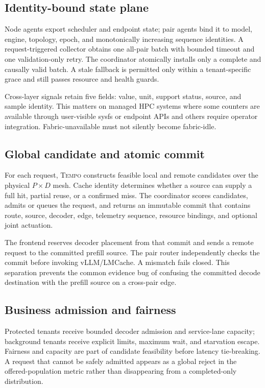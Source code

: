 \documentclass[10pt,twocolumn]{article}
\newcommand{\system}{\textsc{Tempo}\xspace}
\begin{document}
\subsection{Identity-bound state plane}

Node agents export scheduler and endpoint state; pair agents bind it to model,
engine, topology, epoch, and monotonically increasing sequence identities.  A
request-triggered collector obtains one all-pair batch with bounded timeout and
one validation-only retry.  The coordinator atomically installs only a complete
and causally valid batch.  A stale fallback is permitted only within a
tenant-specific grace and still passes resource and health guards.

Cross-layer signals retain five fields: value, unit, support status, source,
and sample identity.  This matters on managed HPC systems where some counters
are available through user-visible sysfs or endpoint APIs and others require
operator integration.  Fabric-unavailable must not silently become
fabric-idle.

\subsection{Global candidate and atomic commit}

For each request, \system constructs feasible local and remote candidates over
the physical $P\times D$ mesh.  Cache identity determines whether a source can
supply a full hit, partial reuse, or a confirmed miss.  The coordinator scores
candidates, admits or queues the request, and returns an immutable commit that
contains route, source, decoder, edge, telemetry sequence, resource bindings,
and optional joint actuation.

The frontend reserves decoder placement from that commit and sends a remote
request to the committed prefill source.  The pair router independently checks
the commit before invoking vLLM/LMCache.  A mismatch fails closed.  This
separation prevents the common evidence bug of confusing the committed decode
destination with the prefill source on a cross-pair edge.

\subsection{Business admission and fairness}

Protected tenants receive bounded decoder admission and service-lane capacity;
background tenants receive explicit limits, maximum wait, and starvation
escape.  Fairness and capacity are part of candidate feasibility before
latency tie-breaking.  A request that cannot be safely admitted appears as a
global reject in the offered-population metric rather than disappearing from a
completed-only distribution.
\end{document}
